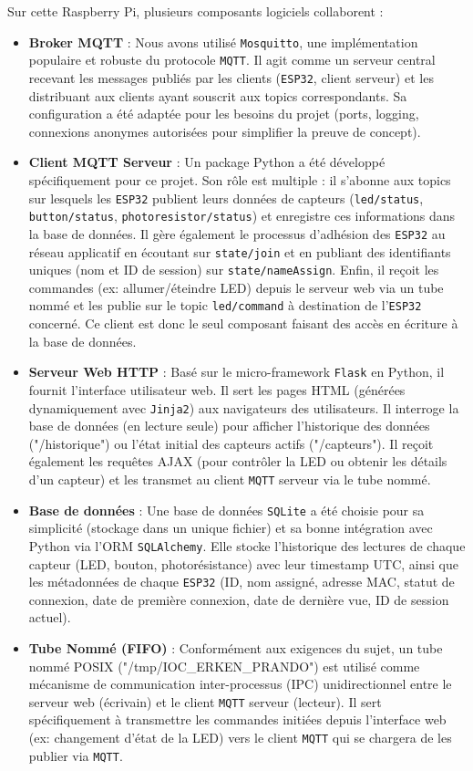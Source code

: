 \documentclass[12pt]{article}
\begin{document}
Sur cette Raspberry Pi, plusieurs composants logiciels collaborent :
\begin{itemize}
    \item \textbf{Broker MQTT} : Nous avons utilisé \texttt{Mosquitto}, une implémentation populaire et robuste du protocole \texttt{MQTT}. Il agit comme un serveur central recevant les messages publiés par les clients (\texttt{ESP32}, client serveur) et les distribuant aux clients ayant souscrit aux topics correspondants. Sa configuration a été adaptée pour les besoins du projet (ports, logging, connexions anonymes autorisées pour simplifier la preuve de concept).
    \item \textbf{Client MQTT Serveur} : Un package Python a été développé spécifiquement pour ce projet. Son rôle est multiple : il s'abonne aux topics sur lesquels les \texttt{ESP32} publient leurs données de capteurs (\texttt{led/status}, \texttt{button/status}, \texttt{photoresistor/status}) et enregistre ces informations dans la base de données. Il gère également le processus d'adhésion des \texttt{ESP32} au réseau applicatif en écoutant sur \texttt{state/join} et en publiant des identifiants uniques (nom et ID de session) sur \texttt{state/nameAssign}. Enfin, il reçoit les commandes (ex: allumer/éteindre LED) depuis le serveur web via un tube nommé et les publie sur le topic \texttt{led/command} à destination de l'\texttt{ESP32} concerné. Ce client est donc le seul composant faisant des accès en écriture à la base de données.
    \item \textbf{Serveur Web HTTP} : Basé sur le micro-framework \texttt{Flask} en Python, il fournit l'interface utilisateur web. Il sert les pages HTML (générées dynamiquement avec \texttt{Jinja2}) aux navigateurs des utilisateurs. Il interroge la base de données (en lecture seule) pour afficher l'historique des données ("/historique") ou l'état initial des capteurs actifs ("/capteurs"). Il reçoit également les requêtes AJAX (pour contrôler la LED ou obtenir les détails d'un capteur) et les transmet au client \texttt{MQTT} serveur via le tube nommé.
    \item \textbf{Base de données} : Une base de données \texttt{SQLite} a été choisie pour sa simplicité (stockage dans un unique fichier) et sa bonne intégration avec Python via l'ORM \texttt{SQLAlchemy}. Elle stocke l'historique des lectures de chaque capteur (LED, bouton, photorésistance) avec leur timestamp UTC, ainsi que les métadonnées de chaque \texttt{ESP32} (ID, nom assigné, adresse MAC, statut de connexion, date de première connexion, date de dernière vue, ID de session actuel).
    \item \textbf{Tube Nommé (FIFO)} : Conformément aux exigences du sujet, un tube nommé POSIX ("/tmp/IOC\_ERKEN\_PRANDO") est utilisé comme mécanisme de communication inter-processus (IPC) unidirectionnel entre le serveur web (écrivain) et le client \texttt{MQTT} serveur (lecteur). Il sert spécifiquement à transmettre les commandes initiées depuis l'interface web (ex: changement d'état de la LED) vers le client \texttt{MQTT} qui se chargera de les publier via \texttt{MQTT}.
\end{itemize}
\end{document}
